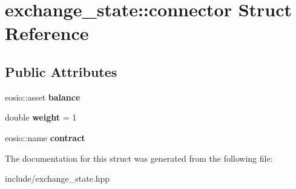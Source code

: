 \hypertarget{structexchange__state_1_1connector}{}\section{exchange\+\_\+state\+:\+:connector Struct Reference}
\label{structexchange__state_1_1connector}
\subsection*{Public Attributes}
\begin{DoxyCompactItemize}
\item 
\mbox{\label{structexchange__state_1_1connector_a26dd4d6582eacf4792bc49acde29e840}} 
eosio\+::asset {\bfseries balance}
\item 
\mbox{\label{structexchange__state_1_1connector_aaefdf596a43f0b04a3193a9831a399b1}} 
double {\bfseries weight} = 1
\item 
\mbox{\label{structexchange__state_1_1connector_a45e6c94700465fc242adff547bdc437f}} 
eosio\+::name {\bfseries contract}
\end{DoxyCompactItemize}


The documentation for this struct was generated from the following file\+:\begin{DoxyCompactItemize}
\item 
include/exchange\+\_\+state.\+hpp\end{DoxyCompactItemize}

